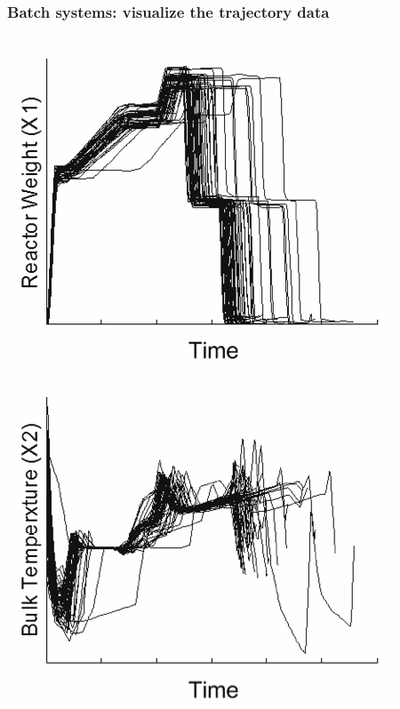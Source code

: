\documentclass[handout, 12pt]{beamer}
\begin{document}
\begin{frame}\frametitle{Batch systems: visualize the trajectory data}
	
	\begin{columns}
			{}
 			\vfill
			\includegraphics[height=0.8\textheight]{images/unaligned-trajectories-many-batches.png}
		

\end{columns}
\end{frame}
\end{document}
